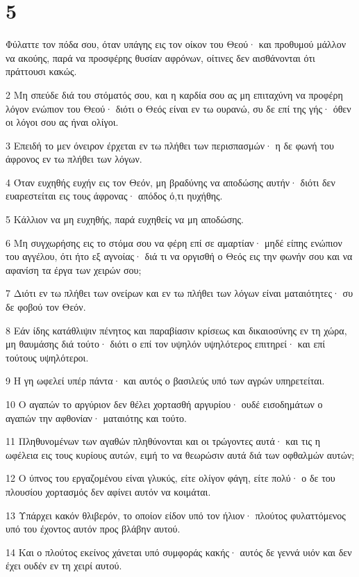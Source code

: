 \chapter{5}

\par Φύλαττε τον πόδα σου, όταν υπάγης εις τον οίκον του Θεού· και προθυμού μάλλον να ακούης, παρά να προσφέρης θυσίαν αφρόνων, οίτινες δεν αισθάνονται ότι πράττουσι κακώς.
\par 2 Μη σπεύδε διά του στόματός σου, και η καρδία σου ας μη επιταχύνη να προφέρη λόγον ενώπιον του Θεού· διότι ο Θεός είναι εν τω ουρανώ, συ δε επί της γής· όθεν οι λόγοι σου ας ήναι ολίγοι.
\par 3 Επειδή το μεν όνειρον έρχεται εν τω πλήθει των περισπασμών· η δε φωνή του άφρονος εν τω πλήθει των λόγων.
\par 4 Όταν ευχηθής ευχήν εις τον Θεόν, μη βραδύνης να αποδώσης αυτήν· διότι δεν ευαρεστείται εις τους άφρονας· απόδος ό,τι ηυχήθης.
\par 5 Κάλλιον να μη ευχηθής, παρά ευχηθείς να μη αποδώσης.
\par 6 Μη συγχωρήσης εις το στόμα σου να φέρη επί σε αμαρτίαν· μηδέ είπης ενώπιον του αγγέλου, ότι ήτο εξ αγνοίας· διά τι να οργισθή ο Θεός εις την φωνήν σου και να αφανίση τα έργα των χειρών σου;
\par 7 Διότι εν τω πλήθει των ονείρων και εν τω πλήθει των λόγων είναι ματαιότητες· συ δε φοβού τον Θεόν.
\par 8 Εάν ίδης κατάθλιψιν πένητος και παραβίασιν κρίσεως και δικαιοσύνης εν τη χώρα, μη θαυμάσης διά τούτο· διότι ο επί τον υψηλόν υψηλότερος επιτηρεί· και επί τούτους υψηλότεροι.
\par 9 Η γη ωφελεί υπέρ πάντα· και αυτός ο βασιλεύς υπό των αγρών υπηρετείται.
\par 10 Ο αγαπών το αργύριον δεν θέλει χορτασθή αργυρίου· ουδέ εισοδημάτων ο αγαπών την αφθονίαν· ματαιότης και τούτο.
\par 11 Πληθυνομένων των αγαθών πληθύνονται και οι τρώγοντες αυτά· και τις η ωφέλεια εις τους κυρίους αυτών, ειμή το να θεωρώσιν αυτά διά των οφθαλμών αυτών;
\par 12 Ο ύπνος του εργαζομένου είναι γλυκύς, είτε ολίγον φάγη, είτε πολύ· ο δε του πλουσίου χορτασμός δεν αφίνει αυτόν να κοιμάται.
\par 13 Υπάρχει κακόν θλιβερόν, το οποίον είδον υπό τον ήλιον· πλούτος φυλαττόμενος υπό του έχοντος αυτόν προς βλάβην αυτού.
\par 14 Και ο πλούτος εκείνος χάνεται υπό συμφοράς κακής· αυτός δε γεννά υιόν και δεν έχει ουδέν εν τη χειρί αυτού.
